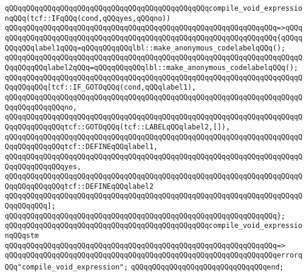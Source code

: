 \newline
\verb|qQQqqQQqqQQqqQQqqQQqqQQqqQQqqQQqqQQqqQQqqQQqqQQqcompile_void_expressionqQQq(tcf::IFqQQq(cond,qQQqyes,qQQqno))|\newline
\verb|qQQqqQQqqQQqqQQqqQQqqQQqqQQqqQQqqQQqqQQqqQQqqQQqqQQqqQQqqQQqqQQq=>qQQq|\newline
\verb|qQQqqQQqqQQqqQQqqQQqqQQqqQQqqQQqqQQqqQQqqQQqqQQqqQQqqQQqqQQqqQQq{qQQqqQQqqQQqlabel1qQQq=qQQqqQQqqQQqlbl::make_anonymous_codelabelqQQq();|\newline
\verb|qQQqqQQqqQQqqQQqqQQqqQQqqQQqqQQqqQQqqQQqqQQqqQQqqQQqqQQqqQQqqQQqqQQqqQQqqQQqqQQqlabel2qQQq=qQQqqQQqqQQqlbl::make_anonymous_codelabelqQQq();|\newline
\newline
\verb|qQQqqQQqqQQqqQQqqQQqqQQqqQQqqQQqqQQqqQQqqQQqqQQqqQQqqQQqqQQqqQQqqQQqqQQqqQQqqQQq[tcf::IF_GOTOqQQq(cond,qQQqlabel1),|\newline
\verb|qQQqqQQqqQQqqQQqqQQqqQQqqQQqqQQqqQQqqQQqqQQqqQQqqQQqqQQqqQQqqQQqqQQqqQQqqQQqqQQqqQQqno,|\newline
\verb|qQQqqQQqqQQqqQQqqQQqqQQqqQQqqQQqqQQqqQQqqQQqqQQqqQQqqQQqqQQqqQQqqQQqqQQqqQQqqQQqqQQqtcf::GOTOqQQq(tcf::LABELqQQqlabel2,[]),|\newline
\verb|qQQqqQQqqQQqqQQqqQQqqQQqqQQqqQQqqQQqqQQqqQQqqQQqqQQqqQQqqQQqqQQqqQQqqQQqqQQqqQQqqQQqtcf::DEFINEqQQqlabel1,|\newline
\verb|qQQqqQQqqQQqqQQqqQQqqQQqqQQqqQQqqQQqqQQqqQQqqQQqqQQqqQQqqQQqqQQqqQQqqQQqqQQqqQQqqQQqyes,|\newline
\verb|qQQqqQQqqQQqqQQqqQQqqQQqqQQqqQQqqQQqqQQqqQQqqQQqqQQqqQQqqQQqqQQqqQQqqQQqqQQqqQQqqQQqtcf::DEFINEqQQqlabel2|\newline
\verb|qQQqqQQqqQQqqQQqqQQqqQQqqQQqqQQqqQQqqQQqqQQqqQQqqQQqqQQqqQQqqQQqqQQqqQQqqQQqqQQq];|\newline
\verb|qQQqqQQqqQQqqQQqqQQqqQQqqQQqqQQqqQQqqQQqqQQqqQQqqQQqqQQqqQQqqQQq};|\newline
\newline
\verb|qQQqqQQqqQQqqQQqqQQqqQQqqQQqqQQqqQQqqQQqqQQqqQQqcompile_void_expressionqQQqstm|\newline
\verb|qQQqqQQqqQQqqQQqqQQqqQQqqQQqqQQqqQQqqQQqqQQqqQQqqQQqqQQqqQQqqQQq=>|\newline
\verb|qQQqqQQqqQQqqQQqqQQqqQQqqQQqqQQqqQQqqQQqqQQqqQQqqQQqqQQqqQQqqQQqerrorqQQq"compile_void_expression";|\newline
\verb|qQQqqQQqqQQqqQQqqQQqqQQqqQQqqQQqend;|\newline
\newline
\newline
